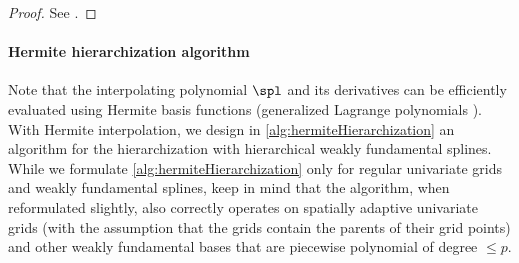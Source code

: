 \begin{proof}
  See \cite{Freund07Stoer}.
\end{proof}

\paragraph{Hermite hierarchization algorithm}

Note that the interpolating polynomial $\spl$ and its derivatives can be
efficiently evaluated using Hermite basis functions
(generalized Lagrange polynomials \cite{Freund07Stoer}).
With Hermite interpolation, we design
in \cref{alg:hermiteHierarchization} an algorithm
for the hierarchization with hierarchical weakly fundamental splines.
While we formulate \cref{alg:hermiteHierarchization}
only for regular univariate grids and weakly fundamental splines,
keep in mind that the algorithm, when reformulated slightly,
also correctly operates
on spatially adaptive univariate grids
(with the assumption that the grids contain the parents of their grid points)
and other weakly fundamental bases that are
piecewise polynomial of degree $\le p$.

